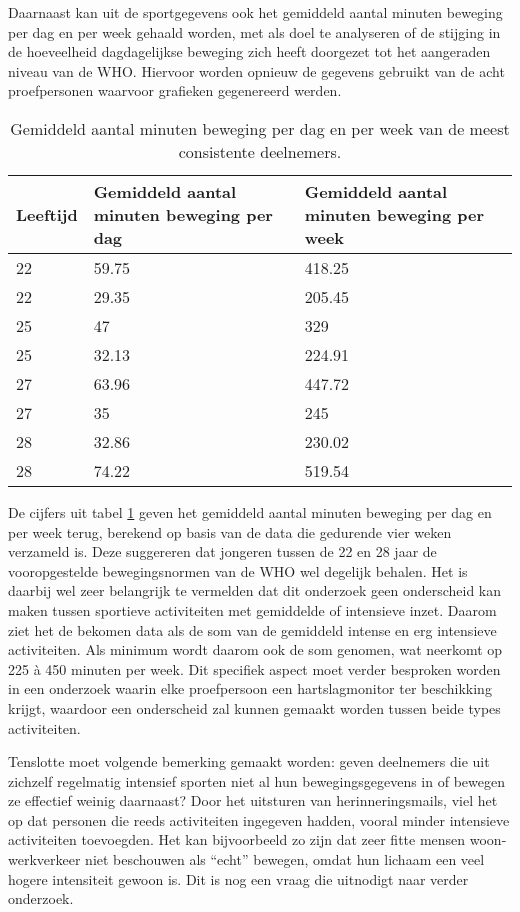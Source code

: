 Daarnaast kan uit de sportgegevens ook het gemiddeld aantal minuten beweging per dag en per week gehaald worden, met als doel te analyseren of de stijging in de hoeveelheid dagdagelijkse beweging zich heeft doorgezet tot het aangeraden niveau van de WHO. Hiervoor worden opnieuw de gegevens gebruikt van de acht proefpersonen waarvoor grafieken gegenereerd werden.

\begin{table}[h]
    \caption[Gemiddeld aantal minuten beweging per dag en per week]{Gemiddeld aantal minuten beweging per dag en per week van de meest consistente deelnemers.}
    \centering
    \label{table:gemiddeldes}
\begin{tabular}{||m{.2\linewidth} m{.4\linewidth} m{.4\linewidth}||}
    \hline
    Leeftijd & Gemiddeld aantal minuten beweging per dag & Gemiddeld aantal minuten beweging per week \\ [0.5ex]
    \hline\hline
    22 & 59.75 & 418.25 \\
    22 & 29.35 & 205.45 \\
    25 & 47 & 329 \\
    25 & 32.13 & 224.91 \\
    27 & 63.96 & 447.72 \\
    27 & 35 & 245 \\
    28 & 32.86 & 230.02 \\
    28 & 74.22 & 519.54 \\ [1ex]
    \hline
\end{tabular}
\end{table}

De cijfers uit tabel \ref{table:gemiddeldes} geven het gemiddeld aantal minuten beweging per dag en per week terug, berekend op basis van de data die gedurende vier weken verzameld is.
Deze suggereren dat jongeren tussen de 22 en 28 jaar de vooropgestelde bewegingsnormen van de WHO wel degelijk behalen.
Het is daarbij wel zeer belangrijk te vermelden dat dit onderzoek geen onderscheid kan maken tussen sportieve activiteiten met gemiddelde of intensieve inzet. Daarom ziet het de bekomen data als de som van de gemiddeld intense en erg intensieve activiteiten. Als minimum wordt daarom ook de som genomen, wat neerkomt op 225 à 450 minuten per week. Dit specifiek aspect moet verder besproken worden in een onderzoek waarin elke proefpersoon een hartslagmonitor ter beschikking krijgt, waardoor een onderscheid zal kunnen gemaakt worden tussen beide types activiteiten.

Tenslotte moet volgende bemerking gemaakt worden: geven deelnemers die uit zichzelf regelmatig intensief sporten niet al hun bewegingsgegevens in of bewegen ze effectief weinig daarnaast? Door het uitsturen van herinneringsmails, viel het op dat personen die reeds activiteiten ingegeven hadden, vooral minder intensieve activiteiten toevoegden. Het kan bijvoorbeeld zo zijn dat zeer fitte mensen woon-werkverkeer niet beschouwen als ``echt'' bewegen, omdat hun lichaam een veel hogere intensiteit gewoon is. Dit is nog een vraag die uitnodigt naar verder onderzoek.

